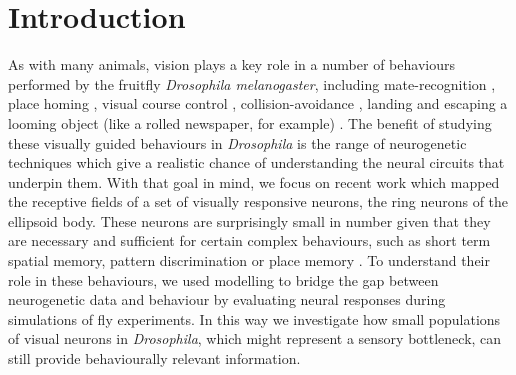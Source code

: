 \section*{Introduction}
As with many animals, vision plays a key role in a number of behaviours performed by the fruitfly \emph{Drosophila melanogaster}, including mate-recognition \cite{Agrawal2014}, place homing \cite{Ofstad2011}, visual course control \cite{Borst2014}, collision-avoidance \cite{Tammero2002}, landing \cite{Tammero2002} and escaping a looming object (like a rolled newspaper, for example) \cite{Card2008}. The benefit of studying these visually guided behaviours in \emph{Drosophila} is the range of neurogenetic techniques which give a realistic chance of understanding the neural circuits that underpin them. With that goal in mind, we focus on recent work \cite{Seelig2013} which mapped the receptive fields of a set of visually responsive neurons, the ring neurons of the ellipsoid body. These neurons are surprisingly small in number given that they are necessary and sufficient for certain complex behaviours, such as short term spatial memory, pattern discrimination or place memory \cite{Ofstad2011,Liu2006,Neuser2008,Seelig2015}. To understand their role in these behaviours, we used modelling to bridge the gap between neurogenetic data and behaviour by evaluating neural responses during simulations of fly experiments. In this way we investigate how small populations of visual neurons in \emph{Drosophila}, which might represent a sensory bottleneck, can still provide behaviourally relevant information.

